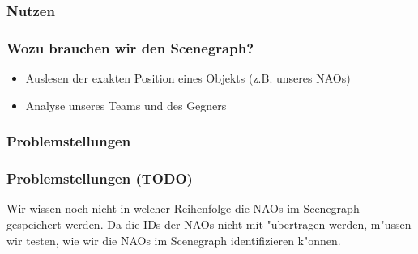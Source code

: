 \subsubsection{Nutzen}
\frame %
{
  \frametitle{Wozu brauchen wir den Scenegraph?} %
  	 \begin{itemize}
	  \item Auslesen der exakten Position eines Objekts (z.B. unseres NAOs)
	  \item Analyse unseres Teams und des Gegners
	\end{itemize}
}

\subsubsection{Problemstellungen}
\frame
{
  \frametitle{Problemstellungen (TODO)} %
	 Wir wissen noch nicht in welcher Reihenfolge die NAOs im Scenegraph gespeichert werden. Da die IDs der NAOs nicht mit "ubertragen werden, m"ussen wir testen, wie wir die NAOs im Scenegraph identifizieren k"onnen.
}